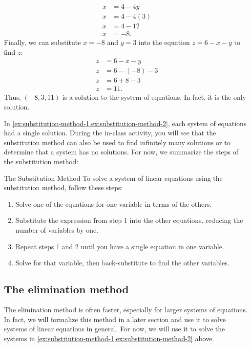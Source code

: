 \documentclass{article}
\begin{document}
\begin{example}
\begin{align*}
    x&=4-4y \\
    x&=4-4(3) \\
    x&=4-12 \\
    x&=-8.
\end{align*}
Finally, we can substitute \(x=-8\) and \(y=3\) into the equation \(z=6-x-y\) to find \(z\):
\begin{align*}
    z&=6-x-y \\
    z&=6-(-8)-3 \\
    z&=6+8-3 \\
    z&=11.
\end{align*}
Thus, \((-8, 3, 11)\) is a solution to the system of equations. In fact, it is the only solution.
\end{example}

In \cref{ex:substitution-method-1,ex:substitution-method-2}, each system of equations had a single solution. During the in-class activity, you will see that the substitution method can also be used to find infinitely many solutions or to determine that a system has no solutions. For now, we summarize the steps of the substitution method:
\begin{calloutbox}{The Substitution Method}\label{box:substitution-method}
    To solve a system of linear equations using the substitution method, follow these steps:
    \begin{enumerate}
        \item Solve one of the equations for one variable in terms of the others.
        \item Substitute the expression from step 1 into the other equations, reducing the number of variables by one.
        \item Repeat steps 1 and 2 until you have a single equation in one variable.
        \item Solve for that variable, then back-substitute to find the other variables.
    \end{enumerate}
\end{calloutbox}

\subsection*{The elimination method}\label{subsec:elimination-method}

The elimination method is often faster, especially for larger systems of equations. In fact, we will formalize this method in a later section and use it to solve systems of linear equations in general. For now, we will use it to solve the systems in \cref{ex:substitution-method-1,ex:substitution-method-2} above.
\end{document}
